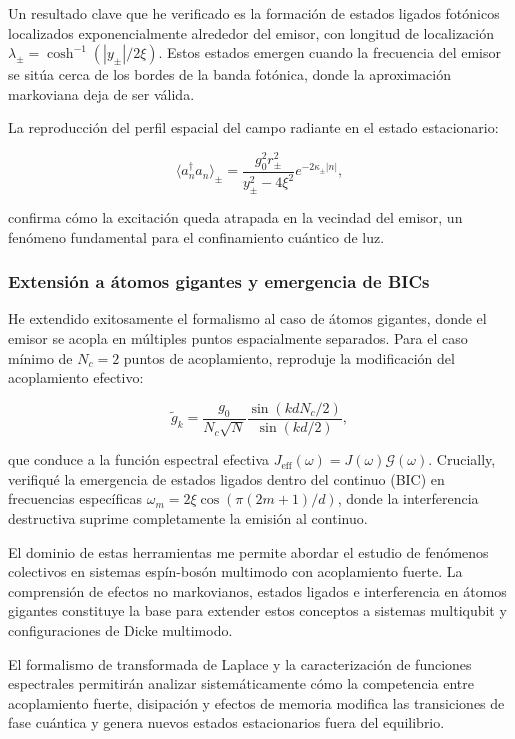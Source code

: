 \documentclass[onecolumn,notitlepage,letterpaper,aps,pra,12pt]{article}
\numberwithin{equation}{section}
\begin{document}
Un resultado clave que he verificado es la formación de estados ligados fotónicos localizados exponencialmente alrededor del emisor, con longitud de localización $\lambda_{\pm} = \cosh^{-1} (|y_{\pm}|/2\xi)$. Estos estados emergen cuando la frecuencia del emisor se sitúa cerca de los bordes de la banda fotónica, donde la aproximación markoviana deja de ser válida. 

La reproducción del perfil espacial del campo radiante en el estado estacionario:

\[\langle a_n^{\dagger}a_n \rangle_{\pm} = \frac{g_0^2 r_{\pm}^2}{y_{\pm}^2 - 4\xi^2} e^{-2\kappa_{\pm}|n|},\]

confirma cómo la excitación queda atrapada en la vecindad del emisor, un fenómeno fundamental para el confinamiento cuántico de luz.

\subsubsection{Extensión a átomos gigantes y emergencia de BICs}

He extendido exitosamente el formalismo al caso de átomos gigantes, donde el emisor se acopla en múltiples puntos espacialmente separados. Para el caso mínimo de $N_c=2$ puntos de acoplamiento, reproduje la modificación del acoplamiento efectivo:

\[\tilde{g}_k = \frac{g_0}{N_c\sqrt{N}} \frac{\sin(kdN_c/2)}{\sin(kd/2)},\]

que conduce a la función espectral efectiva $J_{\text{eff}}(\omega) = J(\omega) \mathcal{G}(\omega)$. Crucially, verifiqué la emergencia de estados ligados dentro del continuo (BIC) en frecuencias específicas $\omega_m = 2\xi\cos(\pi(2m+1)/d)$, donde la interferencia destructiva suprime completamente la emisión al continuo.



El dominio de estas herramientas me permite abordar el estudio de fenómenos colectivos en sistemas espín-bosón multimodo con acoplamiento fuerte. La comprensión de efectos no markovianos, estados ligados e interferencia en átomos gigantes constituye la base para extender estos conceptos a sistemas multiqubit y configuraciones de Dicke multimodo.

El formalismo de transformada de Laplace y la caracterización de funciones espectrales permitirán analizar sistemáticamente cómo la competencia entre acoplamiento fuerte, disipación y efectos de memoria modifica las transiciones de fase cuántica y genera nuevos estados estacionarios fuera del equilibrio.
\end{document}
